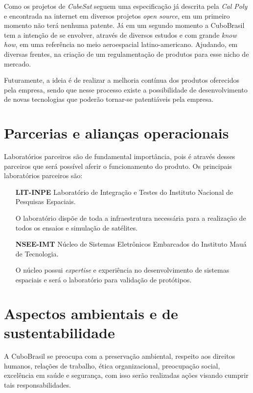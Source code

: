 \documentclass[
	12pt,				%
	openright,			%
	oneside,			%
	a4paper,			%
	english,			%
	french,				%
	spanish,			%
	brazil				%
	]{abntex2}
\begin{document}
	Como os projetos de \textit{CubeSat} seguem uma especificação já descrita pela \textit{Cal Poly} e encontrada na internet em diversos projetos \textit{open source}, em um primeiro momento não terá nenhuma patente. Já em um segundo momento a CuboBrasil tem a intenção de se envolver, através de diversos estudos e com grande \textit{know how}, em uma referência no meio aeroespacial latino-americano. Ajudando, em diversas frentes, na criação de um regulamentação de produtos para esse nicho de mercado.
	
	Futuramente, a ideia é de realizar a melhoria contínua dos produtos oferecidos pela empresa, sendo que nesse processo existe a possibilidade de desenvolvimento de novas tecnologias que poderão tornar-se patentiáveis pela empresa.

\section[Parcerias e alianças operacionais]{Parcerias e alianças operacionais}

	Laboratórios parceiros são de fundamental importância, pois é através desses parceiros que será possível aferir o funcionamento do produto. Os principais laboratórios parceiros são:
	
	\begin{itemize}
		\item[\textbf{LIT-INPE}] Laboratório de Integração e Testes do Instituto Nacional de Pesquisas Espaciais. 
		
		O laboratório dispõe de toda a infraestrutura necessária para a realização de todos os ensaios e simulação de satélites.
		
		\item[\textbf{NSEE-IMT}] Núcleo de Sistemas Eletrônicos Embarcados do Instituto Mauá de Tecnologia.

	O núcleo possui \textit{expertise} e experiência no desenvolvimento de sistemas espaciais e será o laboratório para validação de protótipos.
	\end{itemize}
		

\section[Aspectos ambientais e de sustentabilidade]{Aspectos ambientais e de sustentabilidade}

	A CuboBrasil se preocupa com a preservação ambiental, respeito aos direitos humanos, relações de trabalho, ética organizacional, preocupação social, excelência em saúde e segurança, com isso serão realizadas ações visando cumprir tais responsabilidades.
	
\end{document}
